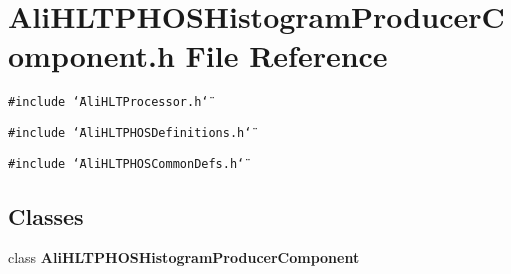 \section{Ali\-HLTPHOSHistogram\-Producer\-Component.h File Reference}
\label{AliHLTPHOSHistogramProducerComponent_8h}


{\tt \#include \char`\"{}Ali\-HLTProcessor.h\char`\"{}}\par
{\tt \#include \char`\"{}Ali\-HLTPHOSDefinitions.h\char`\"{}}\par
{\tt \#include \char`\"{}Ali\-HLTPHOSCommon\-Defs.h\char`\"{}}\par
\subsection*{Classes}
\begin{CompactItemize}
\item 
class {\bf Ali\-HLTPHOSHistogram\-Producer\-Component}
\end{CompactItemize}
